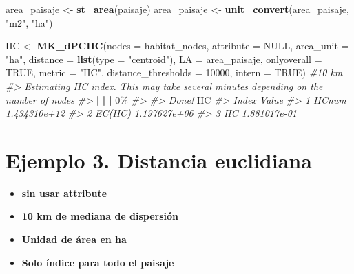 \documentclass[
]{book}
\newenvironment{Shaded}{\begin{snugshade}}{\end{snugshade}}
\newcommand{\AttributeTok}[1]{\textcolor[rgb]{0.13,0.29,0.53}{#1}}
\newcommand{\CommentTok}[1]{\textcolor[rgb]{0.56,0.35,0.01}{\textit{#1}}}
\newcommand{\ConstantTok}[1]{\textcolor[rgb]{0.56,0.35,0.01}{#1}}
\newcommand{\DecValTok}[1]{\textcolor[rgb]{0.00,0.00,0.81}{#1}}
\newcommand{\ErrorTok}[1]{\textcolor[rgb]{0.64,0.00,0.00}{\textbf{#1}}}
\newcommand{\FunctionTok}[1]{\textcolor[rgb]{0.13,0.29,0.53}{\textbf{#1}}}
\newcommand{\NormalTok}[1]{#1}
\newcommand{\OtherTok}[1]{\textcolor[rgb]{0.56,0.35,0.01}{#1}}
\newcommand{\SpecialCharTok}[1]{\textcolor[rgb]{0.81,0.36,0.00}{\textbf{#1}}}
\newcommand{\StringTok}[1]{\textcolor[rgb]{0.31,0.60,0.02}{#1}}
\providecommand{\tightlist}{%
  \setlength{\itemsep}{0pt}\setlength{\parskip}{0pt}}
\begin{document}
\begin{Shaded}
\begin{Highlighting}[]
\NormalTok{area\_paisaje }\OtherTok{\textless{}{-}} \FunctionTok{st\_area}\NormalTok{(paisaje) }
\NormalTok{area\_paisaje }\OtherTok{\textless{}{-}} \FunctionTok{unit\_convert}\NormalTok{(area\_paisaje, }\StringTok{"m2"}\NormalTok{, }\StringTok{"ha"}\NormalTok{) }

\NormalTok{IIC }\OtherTok{\textless{}{-}} \FunctionTok{MK\_dPCIIC}\NormalTok{(}\AttributeTok{nodes =}\NormalTok{ habitat\_nodes,}
                \AttributeTok{attribute =} \ConstantTok{NULL}\NormalTok{,}
                \AttributeTok{area\_unit =} \StringTok{"ha"}\NormalTok{,}
                \AttributeTok{distance =} \FunctionTok{list}\NormalTok{(}\AttributeTok{type =} \StringTok{"centroid"}\NormalTok{),}
                \AttributeTok{LA =}\NormalTok{ area\_paisaje,}
                \AttributeTok{onlyoverall =} \ConstantTok{TRUE}\NormalTok{,}
                \AttributeTok{metric =} \StringTok{"IIC"}\NormalTok{,}
                \AttributeTok{distance\_thresholds =} \DecValTok{10000}\NormalTok{,}
                \AttributeTok{intern =} \ConstantTok{TRUE}\NormalTok{) }\CommentTok{\#10 km}
\CommentTok{\#\textgreater{} Estimating IIC index. This may take several minutes depending on the number of nodes}
\CommentTok{\#\textgreater{} }
  \SpecialCharTok{|}                                                        
  \ErrorTok{|}                                                  \ErrorTok{|}   \DecValTok{0}\NormalTok{\%}
\CommentTok{\#\textgreater{} }
\CommentTok{\#\textgreater{} Done!}
\NormalTok{IIC}
\CommentTok{\#\textgreater{}     Index        Value}
\CommentTok{\#\textgreater{} 1  IICnum 1.434310e+12}
\CommentTok{\#\textgreater{} 2 EC(IIC) 1.197627e+06}
\CommentTok{\#\textgreater{} 3     IIC 1.881017e{-}01}
\end{Highlighting}
\end{Shaded}

\section{Ejemplo 3. Distancia euclidiana}\label{ejemplo-3.-distancia-euclidiana}

\begin{itemize}
\tightlist
\item
  \textbf{sin usar attribute}
\item
  \textbf{10 km de mediana de dispersión}
\item
  \textbf{Unidad de área en ha}
\item
  \textbf{Solo índice para todo el paisaje}
\end{itemize}
\end{document}

